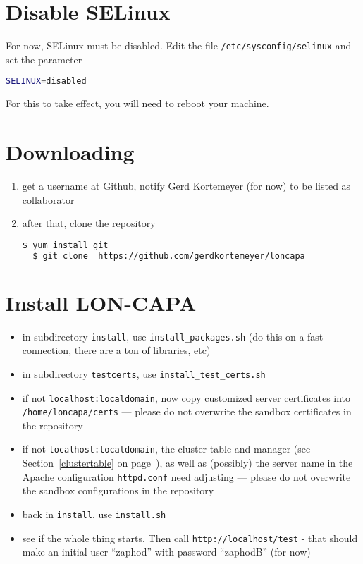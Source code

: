 \section{Disable SELinux}
For now, SELinux must be disabled.  Edit the file {\tt /etc/sysconfig/selinux} and set the parameter 
\begin{lstlisting}[language=bash]
  SELINUX=disabled
\end{lstlisting}
For this to take effect, you will need to reboot your machine.

\section{Downloading}
\begin{enumerate}
\item get a username at Github, notify Gerd Kortemeyer (for now) to be listed as collaborator
\item after that, clone the repository
\begin{lstlisting}[language=bash]
  $ yum install git
  $ git clone  https://github.com/gerdkortemeyer/loncapa
\end{lstlisting}
\end{enumerate}

\section{Install LON-CAPA}
\begin{itemize}
\item in subdirectory {\tt install}, use {\tt install\_packages.sh} (do this on a fast connection, there are a ton of libraries, etc)
\item in subdirectory {\tt testcerts}, use {\tt install\_test\_certs.sh}
\item if not {\tt localhost:localdomain}, now copy customized server certificates into {\tt /home/loncapa/certs} --- please do not overwrite the sandbox certificates in the repository
\item if not {\tt localhost:localdomain}, the cluster table and manager (see Section~\ref{clustertable} on page~\pageref{clustertable}), as well as (possibly) the server name in the Apache configuration {\tt httpd.conf} need adjusting --- please do not overwrite the sandbox configurations in the repository
\item back in {\tt install}, use {\tt install.sh}
\item see if the whole thing starts. Then call {\tt http://localhost/test} - that should make an initial user ``zaphod'' with password ``zaphodB'' (for now)
\end{itemize}

